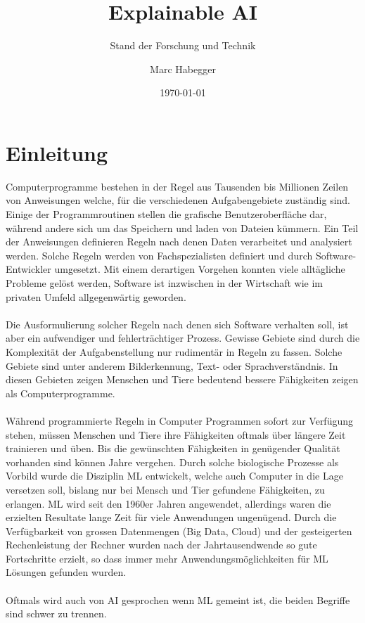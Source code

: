 \documentclass[
  12pt, %
  a4paper, %
  oneside, %
  openany, 
  numbers=noenddot, %
  BCOR=5mm, %
  parskip=half*, %
  thesis, %
]{bfhbook}
\author{Marc Habegger}
\title{Explainable AI}
\subtitle{Stand der Forschung und Technik}
\date{\today} %
\begin{document}
                         
\maketitle

\tableofcontents
\sloppy
\mainmatter %

\chapter{Einleitung}
Computerprogramme bestehen in der Regel aus Tausenden bis Millionen Zeilen von Anweisungen welche, für die verschiedenen Aufgabengebiete zuständig sind. Einige der Programmroutinen stellen die grafische Benutzeroberfläche dar, während andere sich um das Speichern und laden von Dateien kümmern. Ein Teil der Anweisungen definieren Regeln nach denen Daten verarbeitet und analysiert werden. Solche Regeln werden von Fachspezialisten definiert und durch Software-Entwickler umgesetzt. Mit einem derartigen Vorgehen konnten viele alltägliche Probleme gelöst werden, Software ist inzwischen in der Wirtschaft wie im privaten Umfeld allgegenwärtig geworden. 
\\\\
Die Ausformulierung solcher Regeln nach denen sich Software verhalten soll, ist aber ein aufwendiger und fehlerträchtiger Prozess. Gewisse Gebiete sind durch die Komplexität der Aufgabenstellung nur rudimentär in Regeln zu fassen. Solche Gebiete sind unter anderem Bilderkennung, Text- oder Sprachverständnis. In diesen Gebieten zeigen Menschen und Tiere bedeutend bessere Fähigkeiten zeigen als Computerprogramme. 
\\\\
Während programmierte Regeln in Computer Programmen sofort zur Verfügung stehen, müssen Menschen und Tiere ihre Fähigkeiten oftmals über längere Zeit trainieren und üben. Bis die gewünschten Fähigkeiten in genügender Qualität vorhanden sind können Jahre vergehen. Durch solche biologische Prozesse als Vorbild wurde die Disziplin \gls{ML} entwickelt, welche auch Computer in die Lage versetzen soll, bislang nur bei Mensch und Tier gefundene Fähigkeiten, zu erlangen.
\gls{ML} wird seit den 1960er Jahren angewendet, allerdings waren die erzielten Resultate lange Zeit für viele Anwendungen ungenügend. Durch die Verfügbarkeit von grossen Datenmengen (Big Data, Cloud) und der gesteigerten Rechenleistung der Rechner wurden nach der Jahrtausendwende so gute Fortschritte erzielt, so dass immer mehr Anwendungsmöglichkeiten für \gls{ML} Lösungen gefunden wurden. 
\\\\
Oftmals wird auch von \acrfull{AI} gesprochen wenn \acrfull{ML} gemeint ist, die beiden Begriffe sind schwer zu trennen.
\end{document}
